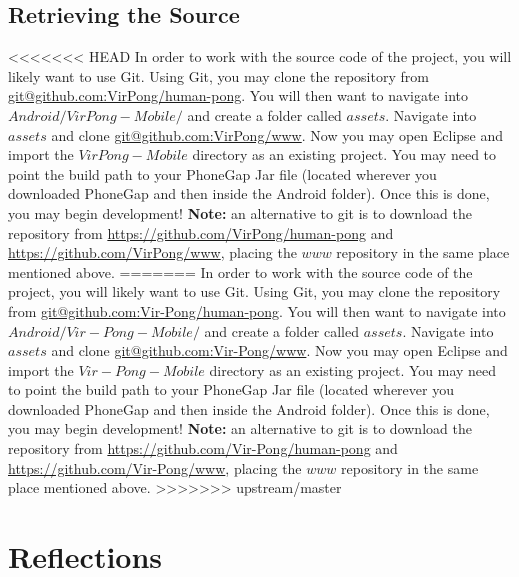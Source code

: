 \documentclass[12pt]{article}
\begin{document}
\subsection{Retrieving the Source}
<<<<<<< HEAD
In order to work with the source code of the project, you will likely want to use Git\cite{Github}.  Using Git, you may clone the repository from \url{git@github.com:VirPong/human-pong}.  You will then want to navigate into $Android/VirPong-Mobile/$ and create a folder called $assets$.  Navigate into $assets$ and clone \url{git@github.com:VirPong/www}.  Now you may open Eclipse and import the $VirPong-Mobile$ directory as an existing project.  You may need to point the build path to your PhoneGap Jar file (located wherever you downloaded PhoneGap and then inside the Android folder).  Once this is done, you may begin development!  \textbf{Note:} an alternative to git is to download the repository from \url{https://github.com/VirPong/human-pong} and \url{https://github.com/VirPong/www}, placing the $www$ repository in the same place mentioned above.
=======
In order to work with the source code of the project, you will likely want to use Git\cite{Github}.  Using Git, you may clone the repository from \url{git@github.com:Vir-Pong/human-pong}.  You will then want to navigate into $Android/Vir-Pong-Mobile/$ and create a folder called $assets$.  Navigate into $assets$ and clone \url{git@github.com:Vir-Pong/www}.  Now you may open Eclipse and import the $Vir-Pong-Mobile$ directory as an existing project.  You may need to point the build path to your PhoneGap Jar file (located wherever you downloaded PhoneGap and then inside the Android folder).  Once this is done, you may begin development!  \textbf{Note:} an alternative to git is to download the repository from \url{https://github.com/Vir-Pong/human-pong} and \url{https://github.com/Vir-Pong/www}, placing the $www$ repository in the same place mentioned above.
>>>>>>> upstream/master

\section{Reflections}
\label{sec:reflections}





\newpage


\end{document}
